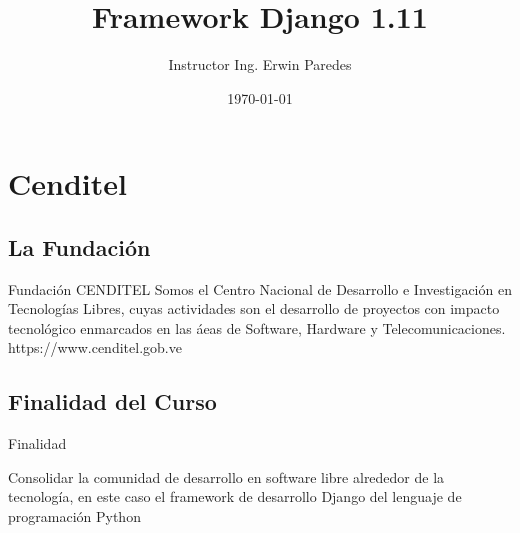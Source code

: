 \documentclass[xcolor=dvipsnames]{beamer}
\title []{Framework Django 1.11}
\author{Instructor Ing. Erwin Paredes}
\institute{CENDITEL}
\date{\today}
\begin{document}
\section{Cenditel}
\begin{frame}
\maketitle
\end{frame}

\subsection{La Fundación}
\begin{frame}
\begin{block}{Fundación CENDITEL}
\indent   
Somos el Centro Nacional de Desarrollo e Investigación en Tecnologías Libres, cuyas actividades son el desarrollo de proyectos con impacto tecnológico enmarcados en las áeas de Software, Hardware y Telecomunicaciones. 
https://www.cenditel.gob.ve

\end{block}
\end{frame}

\subsection{Finalidad del Curso}
\begin{frame}
\begin{block}{Finalidad}
     
Consolidar la comunidad de desarrollo en software libre alrededor de la tecnología, en este caso el framework de desarrollo Django del lenguaje de programación Python
\end{block}
\end{frame}
\end{document}
